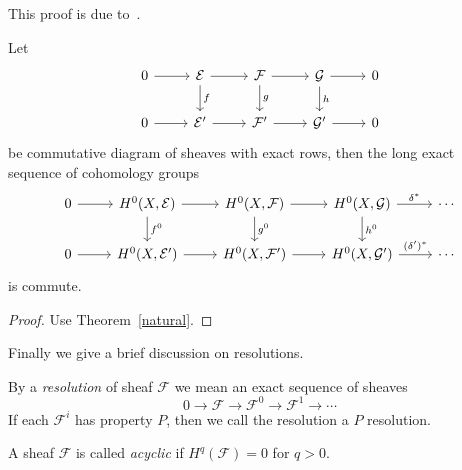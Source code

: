 This proof is due to~\cite{FAC}.

\begin{thm}
    Let
    \[\begin{tikzcd}
        0\ar[r] & \mathcal{E} \ar[r]\ar[d, "f"] & \mathcal{F} \ar[r]\ar[d, "g"] & \mathcal{G} \ar[r]\ar[d, "h"] & 0 \\
        0\ar[r] & \mathcal{E}' \ar[r] & \mathcal{F}'\ar[r] & \mathcal{G}' \ar[r] & 0
    \end{tikzcd}\]
    be commutative diagram of sheaves with exact rows, then the long exact sequence of cohomology groups
    \[\begin{tikzcd}
        0 \ar[r] & H^0(X,\mathcal{E}) \ar[r] \ar[d, "f^0"] & H^0(X,\mathcal{F}) \ar[r] \ar[d, "g^0"] & H^0(X,\mathcal{G}) \ar[r, "\delta^*"] \ar[d, "h^0"] & \cdots\\
        0 \ar[r] & H^0(X,\mathcal{E}') \ar[r] & H^0(X,\mathcal{F}') \ar[r] & H^0(X,\mathcal{G}') \ar[r, "(\delta')^*"] & \cdots
    \end{tikzcd}\]
    is commute.
\end{thm}
\begin{proof}
    Use Theorem~\ref{natural}.
\end{proof}

Finally we give a brief discussion on resolutions.

\begin{defn}
    By a \emph{resolution} of sheaf $\mathcal{F}$ we mean an exact sequence of sheaves
    \[0\to\mathcal{F}\to\mathcal{F}^0\to\mathcal{F}^1\to\cdots\]
    If each $\mathcal{F}^i$ has property $P$, then we call the resolution a $P$ resolution.
\end{defn}

\begin{defn}
    A sheaf $\mathcal{F}$ is called \emph{acyclic} if $H^q(\mathcal{F})=0$ for $q>0$.
\end{defn}

